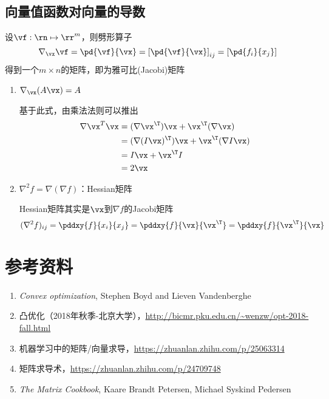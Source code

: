 \subsection{向量值函数对向量的导数}
设$\vf:\rn\mapsto\rr^m$，则劈形算子
\[\nabla_{\vx}\vf=\pd{\vf}{\vx}=\left[\pd{\vf}{\vx}\right]_{ij}=\left[\pd{f_i}{x_j}\right]\]
得到一个$m\times n$的矩阵，即为雅可比(Jacobi)矩阵
\begin{enumerate}
    \item $\nabla_\vx(A\vx)=A$
    \begin{analysis}
        基于此式，由乘法法则可以推出
        \[\begin{aligned}
            \nabla\vx^T\vx&=(\nabla \vx^\T)\vx+\vx^\T(\nabla \vx)\\
            &=(\nabla (I\vx)^\T)\vx+\vx^\T(\nabla I\vx)\\
            &=I\vx+\vx^\T I\\
            &=2\vx
        \end{aligned}\]
    \end{analysis}
    \item $\nabla^2 f=\nabla(\nabla f)$：Hessian矩阵
    \begin{analysis}
        Hessian矩阵其实是$\vx$到$\nabla f$的Jacobi矩阵
        \[(\nabla^2 f)_{ij}=\pddxy{f}{x_i}{x_j}=\pddxy{f}{\vx}{\vx^\T}=\pddxy{f}{\vx^\T}{\vx}\]
    \end{analysis}
\end{enumerate}

\section{参考资料}
\begin{enumerate}
    \item \emph{Convex optimization}, Stephen Boyd and Lieven Vandenberghe
    \item 凸优化（2018年秋季-北京大学），\url{http://bicmr.pku.edu.cn/~wenzw/opt-2018-fall.html}
    \item 机器学习中的矩阵/向量求导，\url{https://zhuanlan.zhihu.com/p/25063314}
    \item 矩阵求导术，\url{https://zhuanlan.zhihu.com/p/24709748}
    \item \emph{The Matrix Cookbook}, Kaare Brandt Petersen, Michael Syskind Pedersen
\end{enumerate}

